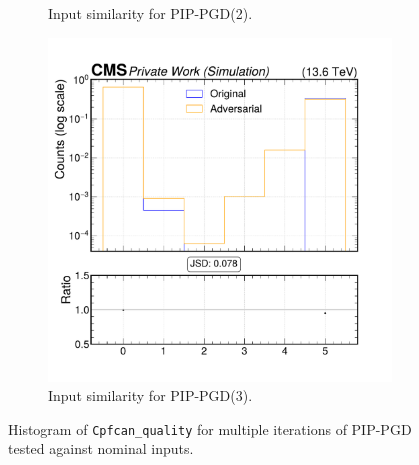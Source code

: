 \begin{figure}[h]
\begin{subfigure}[t]{0.32\textwidth}
    \caption*{Input similarity for PIP-PGD(2).}
  \end{subfigure}\hfill
  \begin{subfigure}[t]{0.32\textwidth}
    \includegraphics[width=\linewidth]{media/output/features/compare/combined_it_3/cmp_cpf_arr_Cpfcan_quality.pdf}
    \caption*{Input similarity for PIP-PGD(3).}
  \end{subfigure}

  \caption*{Histogram of \texttt{Cpfcan\_quality} for multiple iterations of PIP-PGD tested against nominal inputs.}
  \label{fig:combined_input_Cpfcan_quality}
\end{figure}

